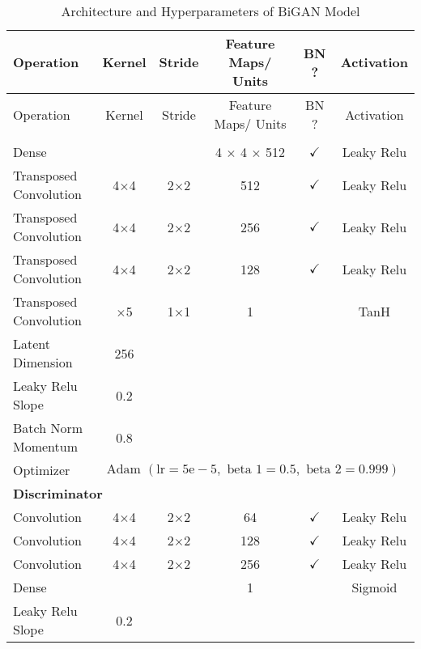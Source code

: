 \footnotesize
\begin{longtable}[c]{@{}lccccc@{}}
	\caption{Architecture and Hyperparameters of BiGAN Model}
	\label{tab:bigan_imp}\\
	\toprule
	Operation & Kernel & Stride & Feature Maps/ Units & BN ? & Activation \\* \midrule
	\endfirsthead
	\toprule
	Operation & Kernel & Stride & Feature Maps/ Units & BN ? & Activation \\* \midrule
	\endhead
	\bottomrule
	\endfoot
	\endlastfoot
	\multicolumn{6}{l}{\textbf{Generator}} \\
	Dense & \multicolumn{1}{c}{} &  & 4 $\times$ 4 $\times$ 512 & $\checkmark$ & Leaky Relu \\
	Transposed Convolution & \multicolumn{1}{c}{4$\times$4} & 2$\times$2 & 512 & $\checkmark$ & Leaky Relu \\
	Transposed Convolution & \multicolumn{1}{c}{4$\times$4} & 2$\times$2 & 256 & $\checkmark$ & Leaky Relu \\
	Transposed Convolution & \multicolumn{1}{c}{4$\times$4} & 2$\times$2 & 128 & $\checkmark$ & Leaky Relu \\
	Transposed Convolution & \multicolumn{1}{c}{$\times$5} & 1$\times$1 & 1 &  & TanH \\ \hline
	Latent Dimension & 256 & \multicolumn{1}{l}{} & \multicolumn{1}{l}{} & \multicolumn{1}{l}{} & \multicolumn{1}{l}{} \\
	Leaky Relu Slope & 0.2 & \multicolumn{1}{l}{} & \multicolumn{1}{l}{} & \multicolumn{1}{l}{} & \multicolumn{1}{l}{} \\
	Batch Norm Momentum & 0.8 & \multicolumn{1}{l}{} & \multicolumn{1}{l}{} & \multicolumn{1}{l}{} & \multicolumn{1}{l}{} \\
	Optimizer & \multicolumn{5}{l}{$\text { Adam }(\mathrm{lr}=5 \mathrm{e}-5, \text { beta } 1=0.5, \text { beta } 2=0.999)$} \\ \hline
	\multicolumn{6}{l}{\textbf{Discriminator}} \\
	Convolution & \multicolumn{1}{c}{4$\times$4} & 2$\times$2 & 64 & $\checkmark$ & Leaky Relu \\
	Convolution & \multicolumn{1}{c}{4$\times$4} & 2$\times$2 & 128 & $\checkmark$ & Leaky Relu \\
	Convolution & \multicolumn{1}{c}{4$\times$4} & 2$\times$2 & 256 & $\checkmark$ & Leaky Relu \\
	Dense & \multicolumn{1}{c}{} &  & 1 &  & Sigmoid \\ \hline
	Leaky Relu Slope & 0.2 & \multicolumn{1}{l}{} & \multicolumn{1}{l}{} & \multicolumn{1}{l}{} & \multicolumn{1}{l}{} \\

\end{longtable}
